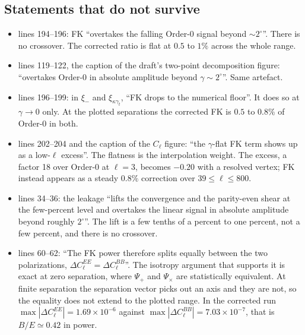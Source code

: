 \subsection{Statements that do not survive}

\begin{itemize}
\item {} lines 194--196: FK ``overtakes the falling
Order-0 signal beyond $\sim2^\circ$''. There is no crossover. The corrected
ratio is flat at $0.5$ to $1\%$ across the whole range.

\item {} lines 119--122, the caption of the draft's
two-point decomposition figure: ``overtakes Order-0 in absolute
amplitude beyond $\gamma\sim2^\circ$''. Same artefact.

\item {} lines 196--199: in $\xi_-$ and
$\xi_{\kappa\gamma_t}$, ``FK drops to the numerical floor''. It does so at
$\gamma\to0$ only. At the plotted separations the corrected FK is $0.5$ to
$0.8\%$ of Order-0 in both.

\item {} lines 202--204 and the caption of the
$C_\ell$ figure: ``the $\gamma$-flat FK term shows up as a low-$\ell$
excess''. The flatness is the interpolation weight. The excess, a factor 18
over Order-0 at $\ell=3$, becomes $-0.20$ with a resolved vertex; FK
instead appears as a steady $0.8\%$ correction over $39\le\ell\le800$.

\item {} lines 34--36: the leakage ``lifts the
convergence and the parity-even shear at the few-percent level and
overtakes the linear signal in absolute amplitude beyond roughly
$2^\circ$''. The lift is a few tenths of a percent to one percent, not a
few percent, and there is no crossover.

\item {} lines 60--62: ``The FK power therefore splits
equally between the two polarizations,
$\Delta C_\ell^{EE}=\Delta C_\ell^{BB}$''. The isotropy argument that
supports it is exact at zero separation, where $\Psi_+$ and $\Psi_\times$
are statistically equivalent. At finite separation the separation vector
picks out an axis and they are not, so the equality does not extend to the
plotted range. In the corrected run
$\max|\Delta C_\ell^{EE}| = 1.69\times10^{-6}$ against
$\max|\Delta C_\ell^{BB}| = 7.03\times10^{-7}$, that is $B/E\simeq0.42$ in
power.


\end{itemize}
